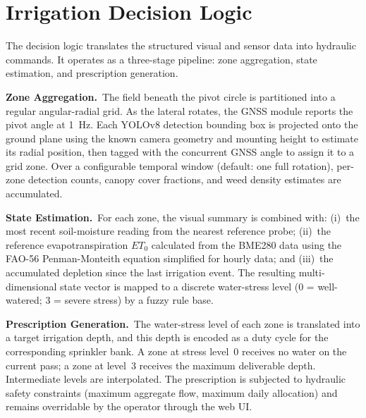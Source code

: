 \documentclass[12pt,a4paper]{report}
\begin{document}
\section{Irrigation Decision Logic}

The decision logic translates the structured visual and sensor data into hydraulic commands. It operates as a three-stage pipeline: zone aggregation, state estimation, and prescription generation.

\textbf{Zone Aggregation.}~The field beneath the pivot circle is partitioned into a regular angular-radial grid. As the lateral rotates, the GNSS module reports the pivot angle at 1~Hz. Each YOLOv8 detection bounding box is projected onto the ground plane using the known camera geometry and mounting height to estimate its radial position, then tagged with the concurrent GNSS angle to assign it to a grid zone. Over a configurable temporal window (default: one full rotation), per-zone detection counts, canopy cover fractions, and weed density estimates are accumulated.

\textbf{State Estimation.}~For each zone, the visual summary is combined with: (i)~the most recent soil-moisture reading from the nearest reference probe; (ii)~the reference evapotranspiration $ET_0$ calculated from the BME280 data using the FAO-56 Penman-Monteith equation simplified for hourly data; and (iii)~the accumulated depletion since the last irrigation event. The resulting multi-dimensional state vector is mapped to a discrete water-stress level (0 = well-watered; 3 = severe stress) by a fuzzy rule base.

\textbf{Prescription Generation.}~The water-stress level of each zone is translated into a target irrigation depth, and this depth is encoded as a duty cycle for the corresponding sprinkler bank. A zone at stress level~0 receives no water on the current pass; a zone at level~3 receives the maximum deliverable depth. Intermediate levels are interpolated. The prescription is subjected to hydraulic safety constraints (maximum aggregate flow, maximum daily allocation) and remains overridable by the operator through the web UI.
\end{document}
